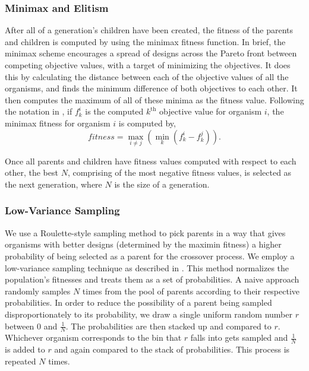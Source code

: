 \documentclass[letterpaper, 10 pt, conference]{ieeeconf}  %
\begin{document}
\subsubsection{Minimax and Elitism}

After all of a generation's children have been created, the fitness of the parents and children is computed by using the minimax fitness function. In brief, the minimax scheme encourages a spread of designs across the Pareto front between competing objective values, with a target of minimizing the objectives. It does this by calculating the distance between each of the objective values of all the organisms, and finds the minimum difference of both objectives to each other. It then computes the maximum of all of these minima as the fitness value. Following the notation in \cite{Parkinson2019}, if $f_k^i$ is the computed $k^{\mathrm{th}}$ objective value for organism $i$, the minimax fitness for organism $i$ is computed by,
\begin{equation}%
    fitness = \max_{i \neq j}\left(\min_{k}\left(f_k^i - f_k^j\right)\right).
\end{equation}

Once all parents and children have fitness values computed with respect to each other, the best $N$, comprising of the most negative fitness values, is selected as the next generation, where $N$ is the size of a generation.

\subsubsection{Low-Variance Sampling}

We use a Roulette-style sampling method to pick parents in a way that gives organisms with better designs (determined by the maximin fitness) a higher probability of being selected as a parent for the crossover process. We employ a low-variance sampling technique as described in \cite{Thrun2006}. This method normalizes the population's fitnesses and treats them as a set of probabilities. A naive approach randomly samples $N$ times from the pool of parents according to their respective probabilities. In order to reduce the possibility of a parent being sampled disproportionately to its probability, we draw a single uniform random number $r$ between 0 and $\tfrac{1}{N}$. The probabilities are then stacked up and compared to $r$. Whichever organism corresponds to the bin that $r$ falls into gets sampled and $\tfrac{1}{N}$ is added to $r$ and again compared to the stack of probabilities. This process is repeated $N$ times.
\end{document}
